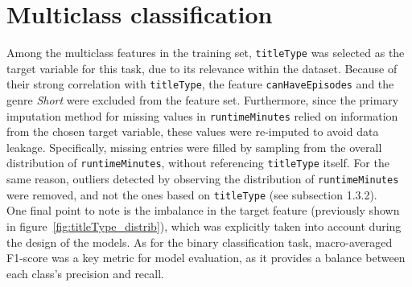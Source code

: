 \section{Multiclass classification}\label{sec:multiclass_classification}
Among the multiclass features in the training set, \texttt{titleType} was selected as the target variable
for this task, due to its relevance within the dataset. Because of their strong correlation with
\texttt{titleType}, the feature \texttt{canHaveEpisodes} and the genre \textit{Short} were excluded from the
feature set. Furthermore, since the primary imputation method for missing values in \texttt{runtimeMinutes}
relied on information from the chosen target variable, these values were re-imputed to avoid data leakage.
Specifically, missing entries were filled by sampling from the overall distribution of
\texttt{runtimeMinutes}, without referencing \texttt{titleType} itself. 
For the same reason, outliers detected by observing the distribution of \texttt{runtimeMinutes} were removed, 
and not the ones based on \texttt{titleType} (see subsection 1.3.2).\\
One final point to note is the imbalance in the target feature (previously shown in
figure~\ref{fig:titleType_distrib}), which was explicitly taken into account
during the design of the models. As for the binary classification task, macro-averaged F1-score was
a key metric for model evaluation, as it provides a balance between each class's precision and recall.




